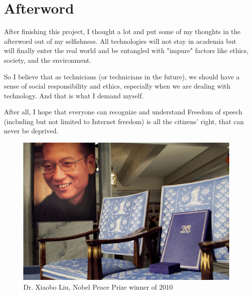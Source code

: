 \section{Afterword}
\begin{frame}
    \small
    After finishing this project, I thought a lot and put some of my thoughts in the afterword out of my selfishness.
    All technologies will not stay in academia but will finally enter the real world and be entangled with "impure" factors like ethics, society, and the environment.
    
    So I believe that as technicians (or technicians in the future), we should have a sense of social responsibility and ethics, especially when we are dealing with technology. And that is what I demand myself.

    After all, I hope that everyone can recognize and understand Freedom of speech (including but not limited to Internet freedom) is all the citizens' right, that can never be deprived.

   \begin{figure}
      \includegraphics[scale=0.05]{pics/XiaoboLiu_Nobel} 
      \caption{Dr. Xiaobo Liu, Nobel Peace Prize winner of 2010\cite{Dr_xiaobo_liu}}
   \end{figure}

\end{frame}






% 
